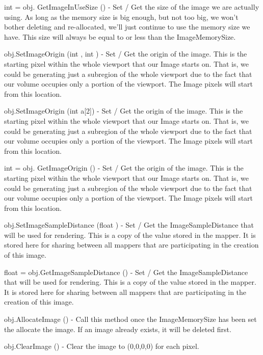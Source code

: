 \begin{DoxyItemize}
\item {\ttfamily int = obj. Get\-Image\-In\-Use\-Size ()} -\/ Set / Get the size of the image we are actually using. As long as the memory size is big enough, but not too big, we won't bother deleting and re-\/allocated, we'll just continue to use the memory size we have. This size will always be equal to or less than the Image\-Memory\-Size.  
\item {\ttfamily obj.\-Set\-Image\-Origin (int , int )} -\/ Set / Get the origin of the image. This is the starting pixel within the whole viewport that our Image starts on. That is, we could be generating just a subregion of the whole viewport due to the fact that our volume occupies only a portion of the viewport. The Image pixels will start from this location.  
\item {\ttfamily obj.\-Set\-Image\-Origin (int a\mbox{[}2\mbox{]})} -\/ Set / Get the origin of the image. This is the starting pixel within the whole viewport that our Image starts on. That is, we could be generating just a subregion of the whole viewport due to the fact that our volume occupies only a portion of the viewport. The Image pixels will start from this location.  
\item {\ttfamily int = obj. Get\-Image\-Origin ()} -\/ Set / Get the origin of the image. This is the starting pixel within the whole viewport that our Image starts on. That is, we could be generating just a subregion of the whole viewport due to the fact that our volume occupies only a portion of the viewport. The Image pixels will start from this location.  
\item {\ttfamily obj.\-Set\-Image\-Sample\-Distance (float )} -\/ Set / Get the Image\-Sample\-Distance that will be used for rendering. This is a copy of the value stored in the mapper. It is stored here for sharing between all mappers that are participating in the creation of this image.  
\item {\ttfamily float = obj.\-Get\-Image\-Sample\-Distance ()} -\/ Set / Get the Image\-Sample\-Distance that will be used for rendering. This is a copy of the value stored in the mapper. It is stored here for sharing between all mappers that are participating in the creation of this image.  
\item {\ttfamily obj.\-Allocate\-Image ()} -\/ Call this method once the Image\-Memory\-Size has been set the allocate the image. If an image already exists, it will be deleted first.  
\item {\ttfamily obj.\-Clear\-Image ()} -\/ Clear the image to (0,0,0,0) for each pixel.  

\end{DoxyItemize}
